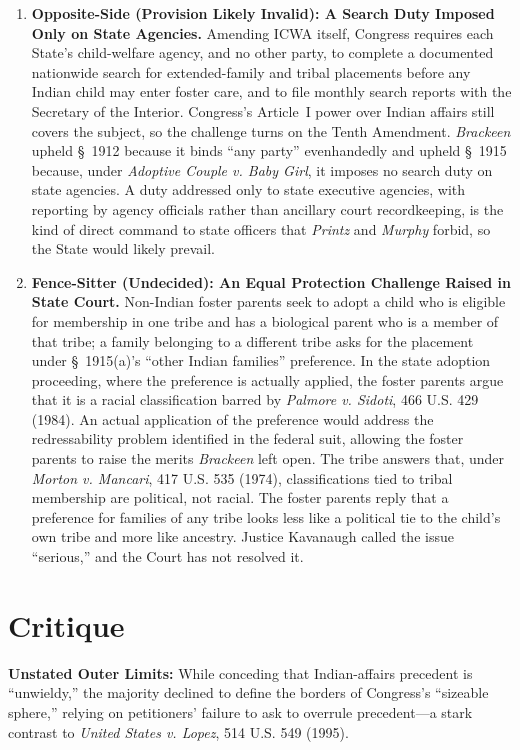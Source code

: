 \documentclass[12pt]{article}
\begin{document}
\begin{enumerate}
\item \textbf{Opposite-Side (Provision Likely Invalid): A Search Duty Imposed Only on State Agencies.} Amending ICWA itself, Congress requires each State's child-welfare agency, and no other party, to complete a documented nationwide search for extended-family and tribal placements before any Indian child may enter foster care, and to file monthly search reports with the Secretary of the Interior. Congress's Article~I power over Indian affairs still covers the subject, so the challenge turns on the Tenth Amendment. \textit{Brackeen} upheld \S~1912 because it binds ``any party'' evenhandedly and upheld \S~1915 because, under \textit{Adoptive Couple v. Baby Girl}, it imposes no search duty on state agencies. A duty addressed only to state executive agencies, with reporting by agency officials rather than ancillary court recordkeeping, is the kind of direct command to state officers that \textit{Printz} and \textit{Murphy} forbid, so the State would likely prevail.

\item \textbf{Fence-Sitter (Undecided): An Equal Protection Challenge Raised in State Court.} Non-Indian foster parents seek to adopt a child who is eligible for membership in one tribe and has a biological parent who is a member of that tribe; a family belonging to a different tribe asks for the placement under \S~1915(a)'s ``other Indian families'' preference. In the state adoption proceeding, where the preference is actually applied, the foster parents argue that it is a racial classification barred by \textit{Palmore v. Sidoti}, 466 U.S. 429 (1984). An actual application of the preference would address the redressability problem identified in the federal suit, allowing the foster parents to raise the merits \textit{Brackeen} left open. The tribe answers that, under \textit{Morton v. Mancari}, 417 U.S. 535 (1974), classifications tied to tribal membership are political, not racial. The foster parents reply that a preference for families of any tribe looks less like a political tie to the child's own tribe and more like ancestry. Justice Kavanaugh called the issue ``serious,'' and the Court has not resolved it.

\end{enumerate}

\section{Critique}
\textbf{Unstated Outer Limits:} While conceding that Indian-affairs precedent is ``unwieldy,'' the majority declined to define the borders of Congress's ``sizeable sphere,'' relying on petitioners' failure to ask to overrule precedent---a stark contrast to \textit{United States v. Lopez}, 514 U.S. 549 (1995).
\end{document}
